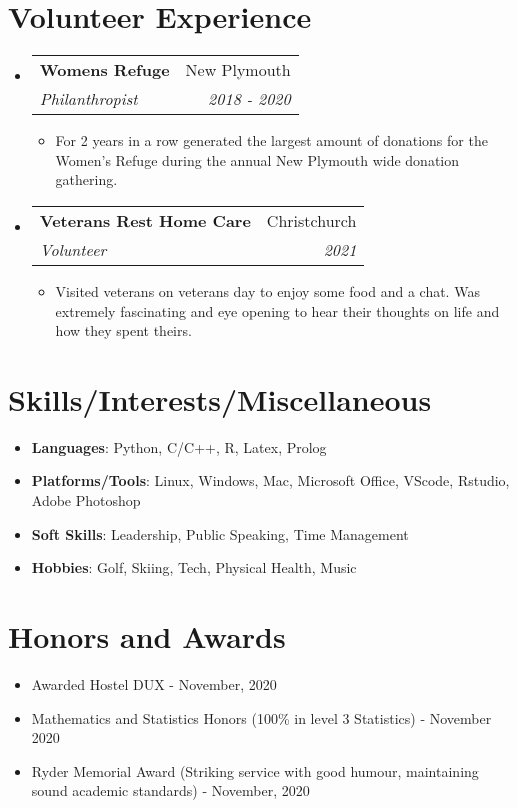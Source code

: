 \documentclass[a4paper,20pt]{article}
\makeatletter
\newcommand{\resumeItem}[2]{
  \item\small{
    \textbf{#1}{: #2 \vspace{-2pt}}
  }
}
\newcommand{\resumeSubheading}[4]{
  \vspace{-1pt}\item
    \begin{tabular*}{0.97\textwidth}{l@{\extracolsep{\fill}}r}
      \textbf{#1} & #2 \\
      \textit{#3} & \textit{#4} \\
    \end{tabular*}\vspace{-5pt}
}
\newcommand{\resumeSubItem}[2]{\resumeItem{#1}{#2}\vspace{-3pt}}
\newcommand{\resumeSubHeadingListStart}{\begin{itemize}[leftmargin=*]}
\newcommand{\resumeSubHeadingListEnd}{\end{itemize}}
\newcommand{\resumeItemListStart}{\begin{itemize}}
\newcommand{\resumeItemListEnd}{\end{itemize}\vspace{-5pt}}
\makeatother
\begin{document}
\section{Volunteer Experience}
  \resumeSubHeadingListStart
    \resumeSubheading{Womens Refuge}{New Plymouth}
    {Philanthropist}{2018 - 2020}
    \resumeItemListStart
        \item {For 2 years in a row generated the largest amount of donations for the Women's Refuge during the annual New Plymouth wide donation gathering.}
      \resumeItemListEnd
\vspace{-1pt}
    \resumeSubheading
	{Veterans Rest Home Care}{Christchurch}
	{Volunteer}{2021}
		\resumeItemListStart
        \item {Visited veterans on veterans day to enjoy some food and a chat. Was extremely fascinating and eye opening to hear their thoughts on life and how they spent theirs.}
      \resumeItemListEnd

\resumeSubHeadingListEnd


\vspace{-5pt}
\section{Skills/Interests/Miscellaneous}
\resumeSubHeadingListStart
	\resumeSubItem{Languages}{Python, C/C++, R, Latex, Prolog}
	\resumeSubItem{Platforms/Tools}{Linux, Windows, Mac, Microsoft Office, VScode, Rstudio, Adobe Photoshop}
	\resumeSubItem{Soft Skills}{Leadership, Public Speaking, Time Management}
    \resumeSubItem{Hobbies}{Golf, Skiing, Tech, Physical Health, Music}
\resumeSubHeadingListEnd


\vspace{-2pt}
\section{Honors and Awards}
\resumeSubHeadingListStart
    \item {Awarded Hostel DUX - November, 2020}
    \vspace{-5pt}
    \item {Mathematics and Statistics Honors (100\% in level 3 Statistics) - November 2020}
    \vspace{-5pt}
    \item {Ryder Memorial Award (Striking service with good humour, maintaining sound academic standards) - November, 2020}
\resumeSubHeadingListEnd
\end{document}
